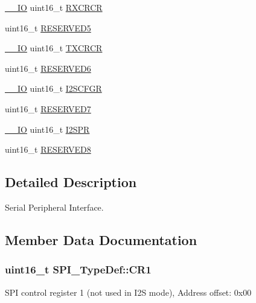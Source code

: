 \begin{DoxyCompactItemize}
\item 
\hyperlink{core__cm4_8h_aec43007d9998a0a0e01faede4133d6be}{\+\_\+\+\_\+\+IO} uint16\+\_\+t \hyperlink{struct_s_p_i___type_def_ab53da6fb851d911ae0b1166be2cfe48a}{R\+X\+C\+R\+CR}
\item 
uint16\+\_\+t \hyperlink{struct_s_p_i___type_def_ab63440e38c7872a8ed11fb2d8d94714e}{R\+E\+S\+E\+R\+V\+E\+D5}
\item 
\hyperlink{core__cm4_8h_aec43007d9998a0a0e01faede4133d6be}{\+\_\+\+\_\+\+IO} uint16\+\_\+t \hyperlink{struct_s_p_i___type_def_a3c0c1be66bc0a1846274a7511f4a36f5}{T\+X\+C\+R\+CR}
\item 
uint16\+\_\+t \hyperlink{struct_s_p_i___type_def_a0870177921541602a44f744f1b66e823}{R\+E\+S\+E\+R\+V\+E\+D6}
\item 
\hyperlink{core__cm4_8h_aec43007d9998a0a0e01faede4133d6be}{\+\_\+\+\_\+\+IO} uint16\+\_\+t \hyperlink{struct_s_p_i___type_def_a20a4775ce461eec0d9a437bed464c0a5}{I2\+S\+C\+F\+GR}
\item 
uint16\+\_\+t \hyperlink{struct_s_p_i___type_def_a98df0a538eb077b2cfc5194eda200f1b}{R\+E\+S\+E\+R\+V\+E\+D7}
\item 
\hyperlink{core__cm4_8h_aec43007d9998a0a0e01faede4133d6be}{\+\_\+\+\_\+\+IO} uint16\+\_\+t \hyperlink{struct_s_p_i___type_def_aecee11b0d2e534b5243e9db6a0e10026}{I2\+S\+PR}
\item 
uint16\+\_\+t \hyperlink{struct_s_p_i___type_def_a0ffe762827b71caff20c75bf105387f6}{R\+E\+S\+E\+R\+V\+E\+D8}
\end{DoxyCompactItemize}


\subsection{Detailed Description}
Serial Peripheral Interface. 

\subsection{Member Data Documentation}
\subsubsection[{\texorpdfstring{C\+R1}{CR1}}]{ uint16\+\_\+t S\+P\+I\+\_\+\+Type\+Def\+::\+C\+R1}\hypertarget{struct_s_p_i___type_def_a1e398155ddd013fcdd41309b4bd0bd5f}{}\label{struct_s_p_i___type_def_a1e398155ddd013fcdd41309b4bd0bd5f}
S\+PI control register 1 (not used in I2S mode), Address offset\+: 0x00 

